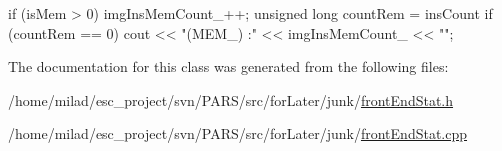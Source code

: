 \begin{DoxyCode}
{
        if (isMem > 0)
                imgInsMemCount_++;
        unsigned long countRem = insCount%
        if (countRem == 0) {
                cout << "(MEM_) :" << imgInsMemCount_ << "\n";
        }
}
\end{DoxyCode}


The documentation for this class was generated from the following files:\begin{DoxyCompactItemize}
\item 
/home/milad/esc\_\-project/svn/PARS/src/forLater/junk/\hyperlink{frontEndStat_8h}{frontEndStat.h}\item 
/home/milad/esc\_\-project/svn/PARS/src/forLater/junk/\hyperlink{frontEndStat_8cpp}{frontEndStat.cpp}\end{DoxyCompactItemize}
